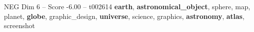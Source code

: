 \begin{textsample}{NEG Dim 6 – Score -6.00 – t002614}  \label{ex:f6_neg_031}
\textbf{earth}, \textbf{astronomical\_object}, sphere, map, planet, \textbf{globe}, graphic\_design, \textbf{universe}, science, graphics, \textbf{astronomy}, \textbf{atlas}, screenshot

\end{textsample}
